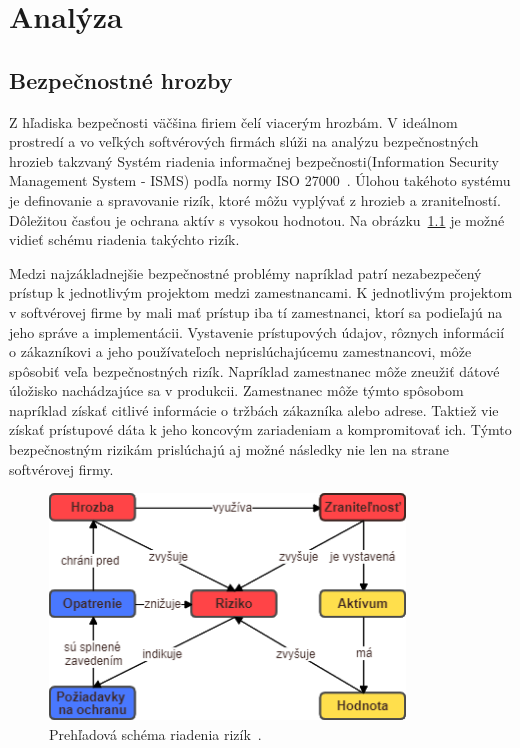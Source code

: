 \chapter{Analýza}\label{ch:analýza}

\section{Bezpečnostné hrozby}\label{sec:podsekcia-1}
\par Z hľadiska bezpečnosti väčšina firiem čelí viacerým hrozbám.
V ideálnom prostredí a vo veľkých softvérových firmách slúži na analýzu bezpečnostných hrozieb takzvaný Systém riadenia
informačnej bezpečnosti(Information Security Management System - ISMS) podľa normy ISO 27000~\cite{ISO27001:2013}.
Úlohou takéhoto systému je definovanie a spravovanie rizík, ktoré môžu vyplývať z hrozieb a zraniteľností.
Dôležitou časťou je ochrana aktív s vysokou hodnotou.
Na obrázku~\ref{fig:obr_1} je možné vidieť schému riadenia takýchto rizík.

Medzi najzákladnejšie bezpečnostné problémy napríklad patrí nezabezpečený prístup k jednotlivým projektom medzi zamestnancami.
K jednotlivým projektom v softvérovej firme by mali mať prístup iba tí zamestnanci, ktorí sa podieľajú na jeho správe a implementácii.
Vystavenie prístupových údajov, rôznych informácií o zákazníkovi a jeho používateľoch neprislúchajúcemu zamestnancovi,
môže spôsobiť veľa bezpečnostných rizík.
Napríklad zamestnanec môže zneužiť dátové úložisko nachádzajúce sa v produkcii.
Zamestnanec môže týmto spôsobom  napríklad získať citlivé informácie o tržbách zákazníka alebo adrese.
Taktiež vie získať prístupové dáta k jeho koncovým zariadeniam a kompromitovať ich.
Týmto bezpečnostným rizikám prislúchajú aj možné následky nie len na strane softvérovej firmy.

\begin{figure}[H]
\begin{center}\includegraphics[width=\textwidth,height=6cm,keepaspectratio=true]{assets/risks.png}\end{center}
\caption[Prehľadová schéma riadenia rizík]{Prehľadová schéma riadenia rizík~\cite{RiskManagement}.}\label{fig:obr_1}
\end{figure}


